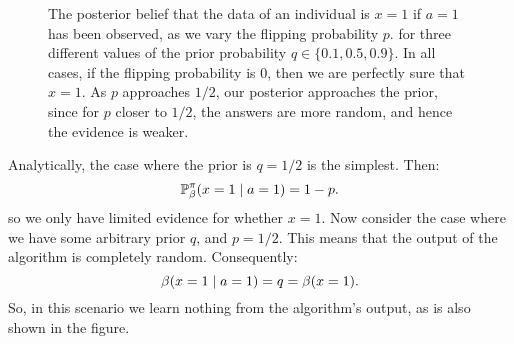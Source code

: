 \begin{frame}
\begin{example}
\begin{figure}[h]
      \caption{The posterior belief that the data of an individual is $x= 1$ if $a = 1$ has been observed, as we vary the flipping probability $p$. for three different values of the prior probability $q \in \{0.1, 0.5, 0.9\}$. In all cases, if the flipping probability is 0, then we are perfectly sure that $x=1$. As $p$ approaches $1/2$, our posterior approaches the prior, since for $p$ closer to $1/2$, the answers are more random, and hence the evidence is weaker.}
      \label{fig:randomised-response}
    \end{figure}
    Analytically, the case where the prior is $q = 1/2$ is the simplest. Then: 
    \[
      \mathop{\mbox{\ensuremath{\mathbb{P}}}}\nolimits^\pi_\beta(x = 1 \mid a = 1) = 1 - p.
    \]
    so we only have limited evidence for whether $x=1$. Now consider the case where we have some arbitrary prior $q$, and $p=1/2$. This means that the output of the algorithm is completely random. Consequently:
    \[
      \beta(x = 1 \mid a = 1) = q = \beta(x=1).
    \]
    So, in this scenario we learn nothing from the algorithm's output, as is also shown in the figure. 
  \end{example}
\end{frame}


